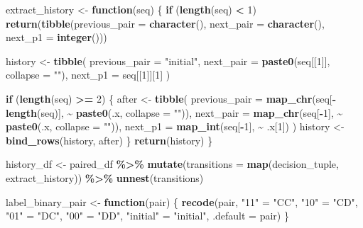 \documentclass[
]{article}
\newenvironment{Shaded}{\begin{snugshade}}{\end{snugshade}}
\newcommand{\AttributeTok}[1]{\textcolor[rgb]{0.13,0.29,0.53}{#1}}
\newcommand{\ControlFlowTok}[1]{\textcolor[rgb]{0.13,0.29,0.53}{\textbf{#1}}}
\newcommand{\DecValTok}[1]{\textcolor[rgb]{0.00,0.00,0.81}{#1}}
\newcommand{\FunctionTok}[1]{\textcolor[rgb]{0.13,0.29,0.53}{\textbf{#1}}}
\newcommand{\NormalTok}[1]{#1}
\newcommand{\OtherTok}[1]{\textcolor[rgb]{0.56,0.35,0.01}{#1}}
\newcommand{\SpecialCharTok}[1]{\textcolor[rgb]{0.81,0.36,0.00}{\textbf{#1}}}
\newcommand{\StringTok}[1]{\textcolor[rgb]{0.31,0.60,0.02}{#1}}
\begin{document}
\begin{Shaded}
\begin{Highlighting}[]
\NormalTok{extract\_history }\OtherTok{\textless{}{-}} \ControlFlowTok{function}\NormalTok{(seq) \{}
  \ControlFlowTok{if}\NormalTok{ (}\FunctionTok{length}\NormalTok{(seq) }\SpecialCharTok{\textless{}} \DecValTok{1}\NormalTok{) }\FunctionTok{return}\NormalTok{(}\FunctionTok{tibble}\NormalTok{(}\AttributeTok{previous\_pair =} \FunctionTok{character}\NormalTok{(), }\AttributeTok{next\_pair =} \FunctionTok{character}\NormalTok{(), }\AttributeTok{next\_p1 =} \FunctionTok{integer}\NormalTok{()))}
  
\NormalTok{  history }\OtherTok{\textless{}{-}} \FunctionTok{tibble}\NormalTok{(}
    \AttributeTok{previous\_pair =} \StringTok{"initial"}\NormalTok{,}
    \AttributeTok{next\_pair =} \FunctionTok{paste0}\NormalTok{(seq[[}\DecValTok{1}\NormalTok{]], }\AttributeTok{collapse =} \StringTok{""}\NormalTok{),}
    \AttributeTok{next\_p1 =}\NormalTok{ seq[[}\DecValTok{1}\NormalTok{]][}\DecValTok{1}\NormalTok{]}
\NormalTok{  )}
  
  \ControlFlowTok{if}\NormalTok{ (}\FunctionTok{length}\NormalTok{(seq) }\SpecialCharTok{\textgreater{}=} \DecValTok{2}\NormalTok{) \{}
\NormalTok{    after }\OtherTok{\textless{}{-}} \FunctionTok{tibble}\NormalTok{(}
      \AttributeTok{previous\_pair =} \FunctionTok{map\_chr}\NormalTok{(seq[}\SpecialCharTok{{-}}\FunctionTok{length}\NormalTok{(seq)], }\SpecialCharTok{\textasciitilde{}} \FunctionTok{paste0}\NormalTok{(.x, }\AttributeTok{collapse =} \StringTok{""}\NormalTok{)),}
      \AttributeTok{next\_pair     =} \FunctionTok{map\_chr}\NormalTok{(seq[}\SpecialCharTok{{-}}\DecValTok{1}\NormalTok{], }\SpecialCharTok{\textasciitilde{}} \FunctionTok{paste0}\NormalTok{(.x, }\AttributeTok{collapse =} \StringTok{""}\NormalTok{)),}
      \AttributeTok{next\_p1       =} \FunctionTok{map\_int}\NormalTok{(seq[}\SpecialCharTok{{-}}\DecValTok{1}\NormalTok{], }\SpecialCharTok{\textasciitilde{}}\NormalTok{ .x[}\DecValTok{1}\NormalTok{])}
\NormalTok{    )}
\NormalTok{    history }\OtherTok{\textless{}{-}} \FunctionTok{bind\_rows}\NormalTok{(history, after)}
\NormalTok{  \}}
  \FunctionTok{return}\NormalTok{(history)}
\NormalTok{\}}

\NormalTok{history\_df }\OtherTok{\textless{}{-}}\NormalTok{ paired\_df }\SpecialCharTok{\%\textgreater{}\%}
  \FunctionTok{mutate}\NormalTok{(}\AttributeTok{transitions =} \FunctionTok{map}\NormalTok{(decision\_tuple, extract\_history)) }\SpecialCharTok{\%\textgreater{}\%}
  \FunctionTok{unnest}\NormalTok{(transitions)}

\NormalTok{label\_binary\_pair }\OtherTok{\textless{}{-}} \ControlFlowTok{function}\NormalTok{(pair) \{}
  \FunctionTok{recode}\NormalTok{(pair,}
         \StringTok{"11"} \OtherTok{=} \StringTok{"CC"}\NormalTok{, }\StringTok{"10"} \OtherTok{=} \StringTok{"CD"}\NormalTok{, }\StringTok{"01"} \OtherTok{=} \StringTok{"DC"}\NormalTok{, }\StringTok{"00"} \OtherTok{=} \StringTok{"DD"}\NormalTok{,}
         \StringTok{"initial"} \OtherTok{=} \StringTok{"initial"}\NormalTok{, }\AttributeTok{.default =}\NormalTok{ pair)}
\NormalTok{\}}
\end{Highlighting}
\end{Shaded}
\end{document}
